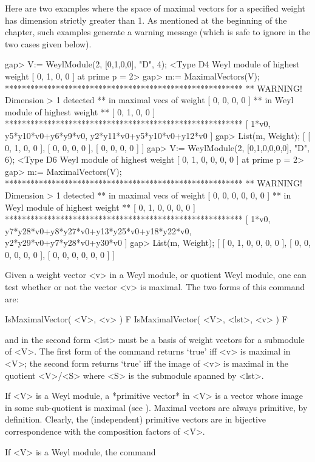 Here are two examples where the space of maximal vectors for a
specified weight has dimension strictly greater than 1. As mentioned
at the beginning of the chapter, such examples generate a warning
message (which is safe to ignore in the two cases given below).

\beginexample
gap> V:= WeylModule(2, [0,1,0,0], "D", 4); 
<Type D4 Weyl module of highest weight [ 0, 1, 0, 0 ] at prime p = 2>
gap> m:= MaximalVectors(V);
********************************************************
** WARNING! Dimension > 1 detected
** in maximal vecs of weight [ 0, 0, 0, 0 ]
** in Weyl module of highest weight
** [ 0, 1, 0, 0 ]
********************************************************
[ 1*v0, y5*y10*v0+y6*y9*v0, y2*y11*v0+y5*y10*v0+y12*v0 ]
gap> List(m, Weight);
[ [ 0, 1, 0, 0 ], [ 0, 0, 0, 0 ], [ 0, 0, 0, 0 ] ]
gap> V:= WeylModule(2, [0,1,0,0,0,0], "D", 6);
<Type D6 Weyl module of highest weight [ 0, 1, 0, 0, 0, 0 ] at prime p = 2>
gap> m:= MaximalVectors(V);                   
********************************************************
** WARNING! Dimension > 1 detected
** in maximal vecs of weight [ 0, 0, 0, 0, 0, 0 ]
** in Weyl module of highest weight
** [ 0, 1, 0, 0, 0, 0 ]
********************************************************
[ 1*v0, y7*y28*v0+y8*y27*v0+y13*y25*v0+y18*y22*v0, y2*y29*v0+y7*y28*v0+y30*v0 
 ]
gap> List(m, Weight);                         
[ [ 0, 1, 0, 0, 0, 0 ], [ 0, 0, 0, 0, 0, 0 ], [ 0, 0, 0, 0, 0, 0 ] ]
\endexample


\bigskip

Given a weight vector <v> in a Weyl module, or quotient Weyl module,
one can test whether or not the vector <v> is maximal. The two forms
of this command are:

\>IsMaximalVector( <V>, <v> ) F
\>IsMaximalVector( <V>, <lst>, <v> ) F

and in the second form <lst> must be a basis of weight vectors for a
submodule of <V>. The first form of the command returns `true' iff <v>
is maximal in <V>; the second form returns `true' iff the image of <v>
is maximal in the quotient <V>/<S> where <S> is the submodule spanned
by <lst>.


\bigskip


If <V> is a Weyl module, a *primitive vector* in <V> is a vector whose
image in some sub-quotient is maximal (see \cite{Xi}). Maximal vectors
are always primitive, by definition. Clearly, the (independent)
primitive vectors are in bijective correspondence with the composition
factors of <V>.

If <V> is a Weyl module, the command

